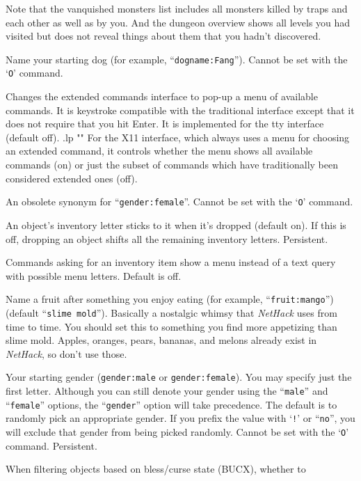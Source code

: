 Note that the vanquished monsters list includes all monsters killed by
traps and each other as well as by you.
And the dungeon overview shows all levels you had visited but does not
reveal things about them that you hadn't discovered.
\item[\ib{dogname}]
Name your starting dog (for example, ``{\tt dogname:Fang}'').
Cannot be set with the `{\tt O}' command.
\item[\ib{extmenu}]
Changes the extended commands interface to pop-up a menu of available commands.
It is keystroke compatible with the traditional interface except that it does
not require that you hit Enter.
It is implemented for the tty interface (default off).
.lp ""
For the X11 interface, which always uses a menu for choosing an extended
command, it controls whether the menu shows all available commands (on)
or just the subset of commands which have traditionally been considered
extended ones (off).
\item[\ib{female}]
An obsolete synonym for ``{\tt gender:female}''.  Cannot be set with the
`{\tt O}' command.
\item[\ib{fixinv}]
An object's inventory letter sticks to it when it's dropped (default on).
If this is off, dropping an object shifts all the remaining inventory letters.
Persistent.
\item[\ib{force\_invmenu}]
Commands asking for an inventory item show a menu instead of
a text query with possible menu letters. Default is off.
\item[\ib{fruit}]
Name a fruit after something you enjoy eating (for example, ``{\tt fruit:mango}'')
(default ``{\tt slime mold}''). Basically a nostalgic whimsy that
{\it NetHack\/} uses from time to time.  You should set this to something you
find more appetizing than slime mold.  Apples, oranges, pears, bananas, and
melons already exist in {\it NetHack\/}, so don't use those.
\item[\ib{gender}]
Your starting gender ({\tt gender:male} or {\tt gender:female}).
You may specify just the first letter.  Although you can
still denote your gender using the ``{\tt male}'' and ``{\tt female}''
options, the ``{\tt gender}'' option will take precedence.
The default is to randomly pick an appropriate gender.
If you prefix the value with `{\tt !}' or ``{\tt no}'', you will
exclude that gender from being picked randomly.
Cannot be set with the `{\tt O}' command.  Persistent.
\item[\ib{goldX}]
When filtering objects based on bless/curse state (BUCX), whether to
